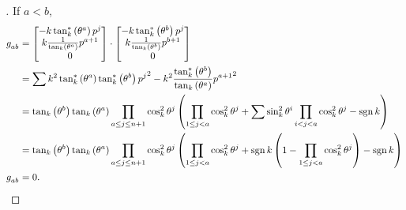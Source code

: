 \documentclass[stu, babel, american, biblatex, a4paper, leqno, draftall]{apa7}
\begin{document}
\begin{proof}[]
    If $a<b$,
    \begin{align*}
        \tensor{g}{_a_b}
                         & =\begin{bmatrix}
                                -k\tan_k^\ast\left(\tensor{\theta}{^a}\right)\tensor{p}{^j}         \\
                                k\frac{1}{\tan_k\left(\tensor{\theta}{^a}\right)}\tensor{p}{^{a+1}} \\
                                0                                                                   \\
                            \end{bmatrix}\cdot\begin{bmatrix}
                                                  -k\tan_k^\ast\left(\tensor{\theta}{^b}\right)\tensor{p}{^j}         \\
                                                  k\frac{1}{\tan_k\left(\tensor{\theta}{^b}\right)}\tensor{p}{^{b+1}} \\
                                                  0                                                                   \\
                                              \end{bmatrix} \\
                         & =
        \sum{
            k^2\tan_k^\ast\left(\tensor{\theta}{^a}\right)\tan_k^\ast\left(\tensor{\theta}{^b}\right){\tensor{p}{^j}}^2
        }
        -k^2\frac{\tan_k^\ast\left(\tensor{\theta}{^b}\right)}{\tan_k\left(\tensor{\theta}{^a}\right)}{\tensor{p}{^{a+1}}}^2               \\
                         & =
        \tan_k\left(\tensor{\theta}{^b}\right)
        \tan_k\left(\tensor{\theta}{^a}\right)
        \prod_{a\le j\le n+1}{\cos_k^2\tensor{\theta}{^j}}
        \left(
        \prod_{1\le j<a}{\cos_k^2\tensor{\theta}{^j}}
        + \sum{
            \sin_k^2{\tensor{\theta}{^{i}}}\prod_{i<j<a}{\cos_k^2\tensor{\theta}{^j}}
        }
        -\sign{k}
        \right)                                                                                                                            \\
                         & =
        \tan_k\left(\tensor{\theta}{^b}\right)
        \tan_k\left(\tensor{\theta}{^a}\right)
        \prod_{a\le j\le n+1}{\cos_k^2\tensor{\theta}{^j}}
        \left(
        \prod_{1\le j<a}{\cos_k^2\tensor{\theta}{^j}}
        + \sign{k}\left(
        1-\prod_{1\le j<a}{\cos_k^2\tensor{\theta}{^j}}
        \right)
        - \sign{k}
        \right)                                                                                                                            \\
        \tensor{g}{_a_b} & = 0 \text{.}
    \end{align*}


\end{proof}
\end{document}
